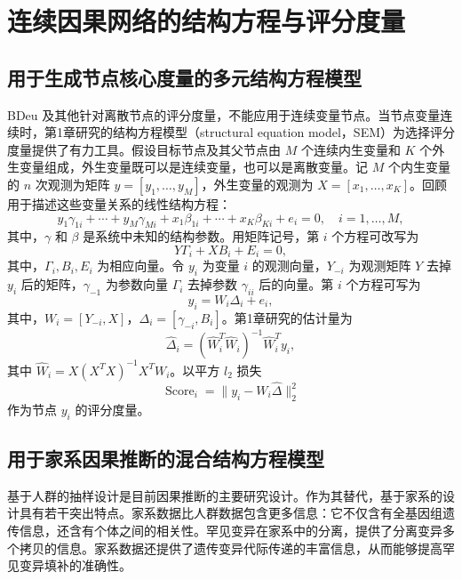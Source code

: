 \section{连续因果网络的结构方程与评分度量}
\label{sec:ch02-continuous-score}
\subsection{用于生成节点核心度量的多元结构方程模型}

BDeu 及其他针对离散节点的评分度量，不能应用于连续变量节点。当节点变量连续时，第1章研究的结构方程模型（structural equation model，SEM）为选择评分度量提供了有力工具。假设目标节点及其父节点由 $M$ 个连续内生变量和 $K$ 个外生变量组成，外生变量既可以是连续变量，也可以是离散变量。记 $M$ 个内生变量的 $n$ 次观测为矩阵 $y=[y_1,\ldots,y_M]$，外生变量的观测为 $X=[x_1,\ldots,x_K]$。回顾用于描述这些变量关系的线性结构方程：
\begin{equation}
y_1\gamma_{1i}+\cdots+y_M\gamma_{Mi}
+x_1\beta_{1i}+\cdots+x_K\beta_{Ki}+e_i=0,\quad i=1,\ldots,M,
\tag{2.14}
\end{equation}
其中，$\gamma$ 和 $\beta$ 是系统中未知的结构参数。用矩阵记号，第 $i$ 个方程可改写为
\begin{equation}
Y\Gamma_i+XB_i+E_i=0,
\tag{2.15}
\end{equation}
其中，$\Gamma_i,B_i,E_i$ 为相应向量。令 $y_i$ 为变量 $i$ 的观测向量，$Y_{-i}$ 为观测矩阵 $Y$ 去掉 $y_i$ 后的矩阵，$\gamma_{-1}$ 为参数向量 $\Gamma_i$ 去掉参数 $\gamma_{ii}$ 后的向量。第 $i$ 个方程可写为
\begin{equation}
y_i=W_i\Delta_i+e_i,
\tag{2.16}
\end{equation}
其中，$W_i=[Y_{-i},X]$，$\Delta_i=[\gamma_{-i},B_i]$。第1章研究的估计量为
\begin{equation}
\widehat\Delta_i=
(\widehat W_i^T\widehat W_i)^{-1}\widehat W_i^T y_i,
\tag{2.17}
\end{equation}
其中 $\widehat W_i=X(X^TX)^{-1}X^TW_i$。以平方 $l_2$ 损失
\begin{equation}
\operatorname{Score}_i=\lVert y_i-W_i\widehat\Delta\rVert_2^2
\tag{2.18}
\end{equation}
作为节点 $y_i$ 的评分度量。

\subsection{用于家系因果推断的混合结构方程模型}

基于人群的抽样设计是目前因果推断的主要研究设计。作为其替代，基于家系的设计具有若干突出特点。家系数据比人群数据包含更多信息：它不仅含有全基因组遗传信息，还含有个体之间的相关性。罕见变异在家系中的分离，提供了分离变异多个拷贝的信息。家系数据还提供了遗传变异代际传递的丰富信息，从而能够提高罕见变异填补的准确性。

